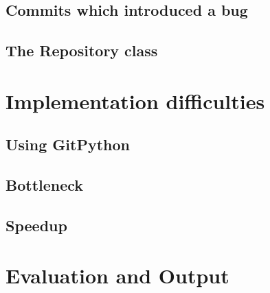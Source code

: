 \documentclass[12pt,twoside,notitlepage]{report}
\begin{document}
\subsection{Commits which introduced a bug}
\subsection{The Repository class}
\section{Implementation difficulties}
\subsection{Using GitPython}
\subsection{Bottleneck}
\subsection{Speedup}
\section{Evaluation and Output}

\end{document}
